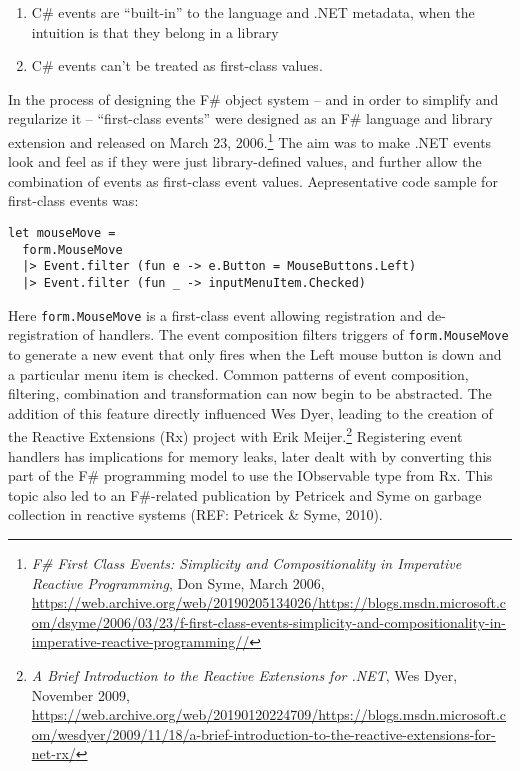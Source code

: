 \documentclass[acmsmall,review]{acmart}\settopmatter{printfolios=true,printccs=false,printacmref=false}
\begin{document}
\begin{enumerate}
\item C\# events are “built-in” to the language and .NET metadata, when the intuition is that they belong in a library
\item C\# events can’t be treated as first-class values.  
\end{enumerate}

In the process of designing the F\# object system – and in order to simplify and regularize it – “first-class events” were designed as an F\# language and library extension and released on March 23, 2006.\footnote{\textit{F\# First Class Events: Simplicity and Compositionality in Imperative Reactive Programming}, Don Syme, March 2006,  \url{https://web.archive.org/web/20190205134026/https://blogs.msdn.microsoft.com/dsyme/2006/03/23/f-first-class-events-simplicity-and-compositionality-in-imperative-reactive-programming//}}  The aim was to make .NET events look and feel as if they were just library-defined values, and further allow the combination of events as first-class event values. Aepresentative code sample for first-class events was:

\begin{verbatim}
let mouseMove = 
  form.MouseMove 
  |> Event.filter (fun e -> e.Button = MouseButtons.Left)
  |> Event.filter (fun _ -> inputMenuItem.Checked)
\end{verbatim}

Here \texttt{form.MouseMove} is a first-class event allowing registration and de-registration of handlers.  The event composition filters triggers of \texttt{form.MouseMove} to generate a new event that only fires when the Left mouse button is down and a particular menu item is checked.  Common patterns of event composition, filtering, combination and transformation can now begin to be abstracted.  The addition of this feature directly influenced Wes Dyer, leading to the creation of the Reactive Extensions (Rx) project with Erik Meijer.\footnote{\textit{A Brief Introduction to the Reactive Extensions for .NET}, Wes Dyer, November 2009, \url{https://web.archive.org/web/20190120224709/https://blogs.msdn.microsoft.com/wesdyer/2009/11/18/a-brief-introduction-to-the-reactive-extensions-for-net-rx/}}  Registering event handlers has implications for memory leaks, later dealt with by converting this part of the F\# programming model to use the IObservable type from Rx.  This topic also led to an F\#-related publication by Petricek and Syme on garbage collection in reactive systems (REF: Petricek \& Syme, 2010).
\end{document}
